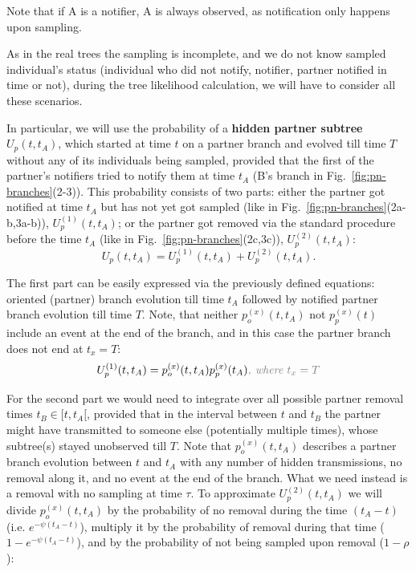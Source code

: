\documentclass[a4paper,10pt]{article}
\begin{document}
Note that if A is a notifier, A is always observed, as notification only happens upon sampling.

As in the real trees the sampling is incomplete, and we do not know sampled individual's status (individual who did not notify, notifier, partner notified in time or not), during the tree likelihood calculation, we will have to consider all these scenarios.

In particular, we will use the probability of a \textbf{hidden partner subtree} $U_p(t, t_A)$, which started at time $t$ on a partner branch and evolved till time $T$ without any of its individuals being sampled, provided that the first of the partner's notifiers tried to notify them at time $t_A$ (B's branch in Fig.~\ref{fig:pn-branches}(2-3)). This probability consists of two parts: either the partner got notified at time $t_A$ but has not yet got sampled (like in Fig.~\ref{fig:pn-branches}(2a-b,3a-b)), $U_p^{(1)}(t, t_A)$;  or the partner got removed via the standard procedure before the time $t_A$ (like in Fig.~\ref{fig:pn-branches}(2c,3c)), $U_p^{(2)}(t, t_A)$: 
\begin{equation}
U_p(t, t_A) = U_p^{(1)}(t, t_A) + U_p^{(2)}(t, t_A).
\end{equation} 

The first part can be easily expressed via the previously defined equations: oriented (partner) branch evolution till time $t_A$ followed by notified partner branch evolution till time $T$. Note, that neither  $p_o^{(x)}(t, t_A)$ not $p_p^{(x)}(t)$ include an event at the end of the branch, and in this case the partner branch does not end at $t_x = T$:
\begin{equation}
U_p^{(1)}(t, t_A) = p_o^{(x)}(t, t_A) p_p^{(x)}(t_A)\textit{\color{gray}, where $t_x =T$}
\end{equation} 

For the second part we would need to integrate over all possible partner removal times $t_B \in [t, t_A[$, provided that in the interval between $t$ and $t_B$ the partner might have transmitted to someone else (potentially multiple times), whose subtree(s) stayed unobserved till $T$. Note that $p_o^{(x)}(t, t_A)$ describes a partner branch evolution between $t$ and $t_A$ with any number of hidden transmissions, no removal along it, and no event at the end of the branch. What we need instead is a removal with no sampling at time $\tau$. To approximate $U_p^{(2)}(t, t_A)$ we will divide $p_o^{(x)}(t, t_A)$ by the probability of no removal during the time $(t_A - t)$ (i.e. $e^{-\psi(t_A - t)}$), multiply it by the probability of removal during that time ($1 - e^{-\psi(t_A - t)}$), and by the probability of not being sampled upon removal ($1 - \rho$):
\end{document}
